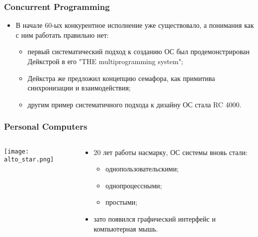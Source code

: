 \begin{frame}
\frametitle{Concurrent Programming}
\begin{itemize}
  \item В начале 60-ых конкурентное исполнение уже существовало, а понимания как
  с ним работать правильно нет:
  \begin{itemize}
    \item первый систематический подход к созданию ОС был продемонстрирован
    Дейкстрой в его "THE multiprogramming system";
    \item Дейкстра же предложил концепцию семафора, как примитива синхронизации
    и взаимодействия;
    \item другим пример систематичного подхода к дизайну ОС стала RC 4000.
  \end{itemize}
\end{itemize}
\end{frame}

\begin{frame}
\frametitle{Personal Computers}
\begin{columns}
  \begin{column}{0.45\textwidth}
    \begin{center}
    \texttt{[image: alto\_star.png]}
    \end{center}
  \end{column}
  \begin{column}{0.55\textwidth}
    \begin{itemize}
      \item 20 лет работы насмарку, ОС системы вновь стали:
      \begin{itemize}
        \item однопользовательскими;
        \item однопроцессными;
        \item простыми;
      \end{itemize}
      \item зато появился графический интерфейс и компьютерная мышь.
    \end{itemize}
  \end{column}
\end{columns}
\end{frame}
